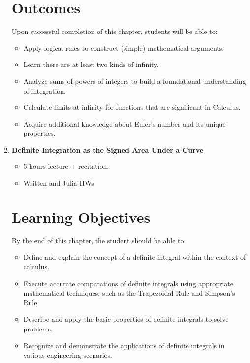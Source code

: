 \documentclass[letterpaper]{book}
\begin{document}
\begin{enumerate}[label={\large\arabic*}, font=\large]
\section*{Outcomes}
Upon successful completion of this chapter, students will be able to:
\begin{itemize}
    \item Apply logical rules to construct (simple) mathematical arguments.
    \item  Learn there are at least two kinds of infinity.
    \item Analyze sums of powers of integers to build a foundational understanding of integration.
    \item Calculate limits at infinity for functions that are significant in Calculus.
    \item Acquire additional knowledge about Euler's number and its unique properties.
\end{itemize}


\bigskip

\item {\Large \bf Definite Integration as the Signed Area Under a Curve}
\begin{itemize}
    \item 5 hours lecture + recitation.
    \item Written and Julia HWs
\end{itemize}

\section*{Learning Objectives}
By the end of this chapter, the student should be able to:
\begin{itemize}
\item Define and explain the concept of a definite integral within the context of calculus.
\item Execute accurate computations of definite integrals using appropriate mathematical techniques, such as the Trapezoidal Rule and Simpson's Rule.
\item Describe and apply the basic properties of definite integrals to solve problems.
\item Recognize and demonstrate the applications of definite integrals in various engineering scenarios.
\end{itemize}



\end{enumerate}
\end{document}
